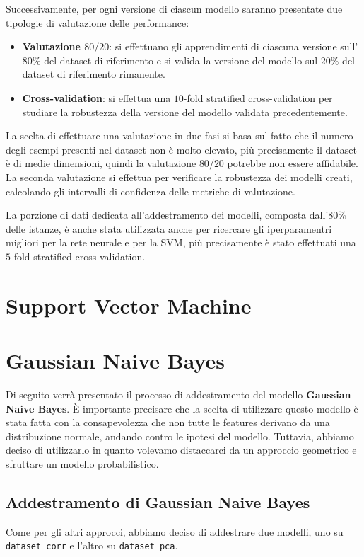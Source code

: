 Successivamente, per ogni versione di ciascun modello saranno presentate due
tipologie di valutazione delle performance:
\begin{itemize}
    \item \textbf{Valutazione $80/20$}: si effettuano gli apprendimenti di
          ciascuna versione sull'$80\%$ del dataset di riferimento e si valida
          la versione del modello sul $20\%$ del dataset di riferimento rimanente.
    \item \textbf{Cross-validation}: si effettua una $10$-fold stratified
          cross-validation per studiare la robustezza della versione del modello
          validata precedentemente.
\end{itemize}
La scelta di effettuare una valutazione in due fasi si basa sul fatto che il
numero degli esempi presenti nel dataset non è molto elevato, più precisamente
il dataset è di medie dimensioni, quindi la valutazione $80/20$ potrebbe non
essere affidabile. La seconda valutazione si effettua per verificare la
robustezza dei modelli creati, calcolando gli intervalli di confidenza delle
metriche di valutazione.

La porzione di dati dedicata all'addestramento dei modelli, composta dall'$80\%$
delle istanze, è anche stata utilizzata anche per ricercare gli iperparamentri 
migliori per la rete neurale e per la SVM, più precisamente è stato effettuati 
una $5$-fold stratified cross-validation.
\section{Support Vector Machine}
\section{Gaussian Naive Bayes}
Di seguito verrà presentato il processo di addestramento del modello
\textbf{Gaussian Naive Bayes}. È importante precisare che la scelta di utilizzare
questo modello è stata fatta con la consapevolezza che non tutte le features
derivano da una distribuzione normale, andando contro le ipotesi del modello.
Tuttavia, abbiamo deciso di utilizzarlo in quanto volevamo distaccarci da un
approccio geometrico e sfruttare un modello probabilistico.
\subsection{Addestramento di Gaussian Naive Bayes}
Come per gli altri approcci, abbiamo deciso di addestrare due modelli, uno su
\texttt{dataset\_corr} e l'altro su \texttt{dataset\_pca}.

